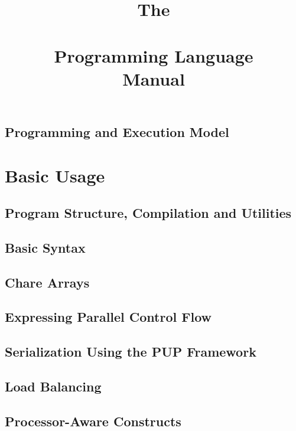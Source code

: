 \documentclass[10pt]{report}
\begin{document}
\title{The\\ \charmpp\\ Programming Language\\ Manual}
\credits{\hspace{0 in}}
\maketitle


\chapter{Programming and Execution Model}




\part{Basic Usage}

\chapter{Program Structure, Compilation and Utilities}
  	
  
  

\chapter{Basic Syntax}
  	
  
  

\chapter{Chare Arrays}
  

\chapter{Expressing Parallel Control Flow}
  

\chapter{Serialization Using the PUP Framework}
  

\chapter{Load Balancing}
  

\chapter{Processor-Aware Constructs}
  
  
\end{document}
